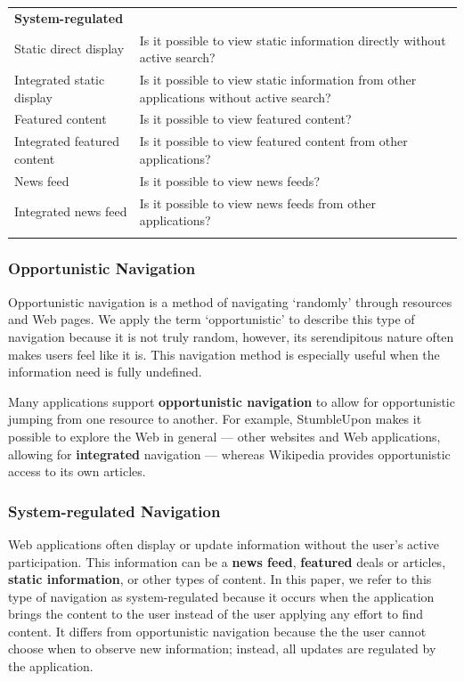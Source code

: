 \documentclass{sigchi}
\begin{document}
{{\begin{table}[ht!]
\begin{tabular}{|p{}| p{}|}
\textbf{System-regulated}            		& \\
Static direct display           & Is it possible to view static information directly without active search? \\
Integrated static display   	& Is it possible to view static information from other applications without active search? \\
Featured content             	& Is it possible to view featured content? \\
Integrated featured content     & Is it possible to view featured content from other applications? \\
News feed             			& Is it possible to view news feeds? \\
Integrated news feed            & Is it possible to view news feeds from other applications? \\
&\\
\hline
\end{tabular}
\end{table}

{\subsubsection{Opportunistic Navigation}
Opportunistic navigation is a method of navigating `randomly' through resources and Web pages. We apply the term `opportunistic' to describe this type of navigation because it is not truly random, however, its serendipitous nature often makes users feel like it is. This navigation method is especially useful when the information need is fully undefined.

Many applications support \textbf{opportunistic navigation} to allow for opportunistic jumping from one resource to another. For example, StumbleUpon makes it possible to explore the Web in general --- other websites and Web applications, allowing for \textbf{integrated} navigation --- whereas Wikipedia provides opportunistic access to its own articles. 
} %


{\subsubsection{System-regulated Navigation}
Web applications often display or update information without the user's active participation. This information can be a \textbf{news feed}, \textbf{featured} deals or articles, \textbf{static information}, or other types of content. In this paper, we refer to this type of navigation as system-regulated because it occurs when the application brings the content to the user instead of the user applying any effort to find content. It differs from opportunistic navigation because the the user cannot choose when to observe new information; instead, all updates are regulated by the application. 

}}}
\end{document}
